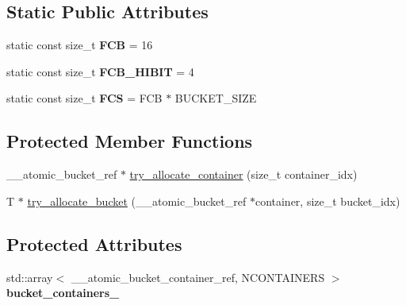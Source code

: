 \subsection*{Static Public Attributes}
\begin{DoxyCompactItemize}
\item 
\mbox{\label{classdialog_1_1monolog_1_1monolog__exp2__linear__base_af859382e3180a5c57e589422cdfc2787}} 
static const size\+\_\+t {\bfseries F\+CB} = 16
\item 
\mbox{\label{classdialog_1_1monolog_1_1monolog__exp2__linear__base_a4c4b8260d785a6e38250613d9e53af76}} 
static const size\+\_\+t {\bfseries F\+C\+B\+\_\+\+H\+I\+B\+IT} = 4
\item 
\mbox{\label{classdialog_1_1monolog_1_1monolog__exp2__linear__base_a2efddcdacec61b6ab8d977c37fa5dad8}} 
static const size\+\_\+t {\bfseries F\+CS} = F\+CB $\ast$ B\+U\+C\+K\+E\+T\+\_\+\+S\+I\+ZE
\end{DoxyCompactItemize}
\subsection*{Protected Member Functions}
\begin{DoxyCompactItemize}
\item 
\+\_\+\+\_\+atomic\+\_\+bucket\+\_\+ref $\ast$ \hyperlink{classdialog_1_1monolog_1_1monolog__exp2__linear__base_a56b328aa81ec88764b1248430318a698}{try\+\_\+allocate\+\_\+container} (size\+\_\+t container\+\_\+idx)
\item 
T $\ast$ \hyperlink{classdialog_1_1monolog_1_1monolog__exp2__linear__base_a9c43f1ba9736a52862b07a9138f40728}{try\+\_\+allocate\+\_\+bucket} (\+\_\+\+\_\+atomic\+\_\+bucket\+\_\+ref $\ast$container, size\+\_\+t bucket\+\_\+idx)
\end{DoxyCompactItemize}
\subsection*{Protected Attributes}
\begin{DoxyCompactItemize}
\item 
\mbox{\label{classdialog_1_1monolog_1_1monolog__exp2__linear__base_adc916e69c6b67a76c2f067f485b954ef}} 
std\+::array$<$ \+\_\+\+\_\+atomic\+\_\+bucket\+\_\+container\+\_\+ref, N\+C\+O\+N\+T\+A\+I\+N\+E\+RS $>$ {\bfseries bucket\+\_\+containers\+\_\+}
\end{DoxyCompactItemize}


